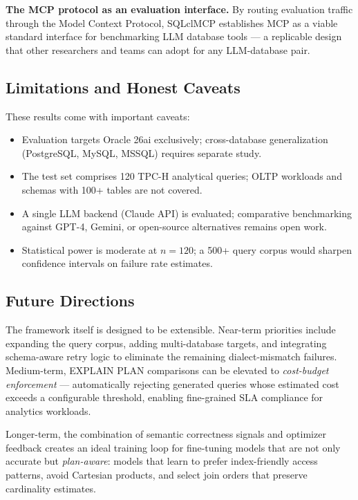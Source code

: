 \textbf{The MCP protocol as an evaluation interface.} By routing evaluation traffic through the Model Context Protocol, SQLclMCP establishes MCP as a viable standard interface for benchmarking LLM database tools — a replicable design that other researchers and teams can adopt for any LLM-database pair.

\subsection{Limitations and Honest Caveats}

These results come with important caveats:
\begin{itemize}
    \item Evaluation targets Oracle 26ai exclusively; cross-database generalization (PostgreSQL, MySQL, MSSQL) requires separate study.
    \item The test set comprises 120 TPC-H analytical queries; OLTP workloads and schemas with 100+ tables are not covered.
    \item A single LLM backend (Claude API) is evaluated; comparative benchmarking against GPT-4, Gemini, or open-source alternatives remains open work.
    \item Statistical power is moderate at $n=120$; a 500+ query corpus would sharpen confidence intervals on failure rate estimates.
\end{itemize}

\subsection{Future Directions}

The framework itself is designed to be extensible. Near-term priorities include expanding the query corpus, adding multi-database targets, and integrating schema-aware retry logic to eliminate the remaining dialect-mismatch failures. Medium-term, EXPLAIN PLAN comparisons can be elevated to \emph{cost-budget enforcement} — automatically rejecting generated queries whose estimated cost exceeds a configurable threshold, enabling fine-grained SLA compliance for analytics workloads.

Longer-term, the combination of semantic correctness signals and optimizer feedback creates an ideal training loop for fine-tuning models that are not only accurate but \emph{plan-aware}: models that learn to prefer index-friendly access patterns, avoid Cartesian products, and select join orders that preserve cardinality estimates.


